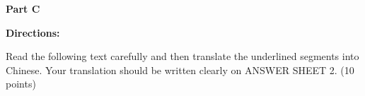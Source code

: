 \textbf{Part C}

\textbf{Directions:}

Read the following text carefully and then translate the underlined segments into Chinese. Your translation should be written clearly on ANSWER SHEET 2. (10 points)

\vspace{6pt}